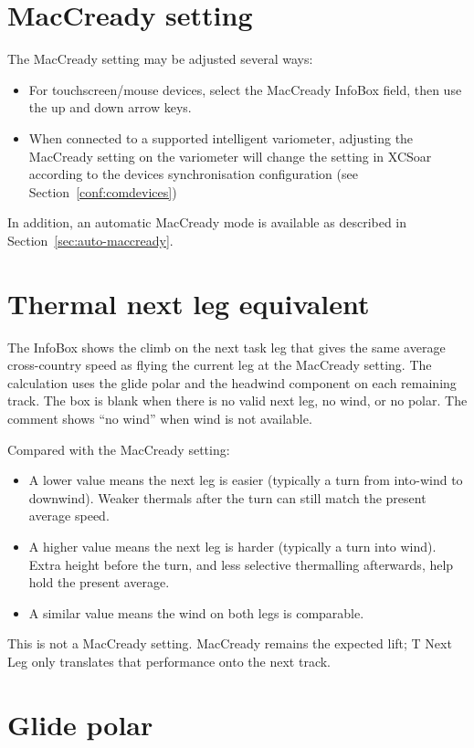 \section{MacCready setting}

The MacCready setting may be adjusted several ways:
\begin{itemize}
\item For touchscreen/mouse devices, select the MacCready InfoBox field, then
  use the up and down arrow keys.
\item When connected to a supported intelligent variometer, adjusting
  the MacCready setting on the variometer will change the setting
  in XCSoar according to the devices synchronisation configuration (see 
  Section~\ref{conf:comdevices})
\end{itemize}
In addition, an automatic MacCready mode is available as described in
Section~\ref{sec:auto-maccready}.


\section{Thermal next leg equivalent}\label{sec:t-next-leg}

The  InfoBox shows the climb on the next task leg
that gives the same average cross-country speed as flying the current
leg at the MacCready setting.  The calculation uses the glide polar and
the headwind component on each remaining track.  The box is blank when
there is no valid next leg, no wind, or no polar.  The comment shows
``no wind'' when wind is not available.

Compared with the MacCready setting:
\begin{itemize}
\item A lower value means the next leg is easier (typically a turn from
  into-wind to downwind).  Weaker thermals after the turn can still
  match the present average speed.
\item A higher value means the next leg is harder (typically a turn
  into wind).  Extra height before the turn, and less selective
  thermalling afterwards, help hold the present average.
\item A similar value means the wind on both legs is comparable.
\end{itemize}

This is not a MacCready setting.  MacCready remains the expected lift;
T Next Leg only translates that performance onto the next track.


\section{Glide polar}\label{sec:glidepolar}


